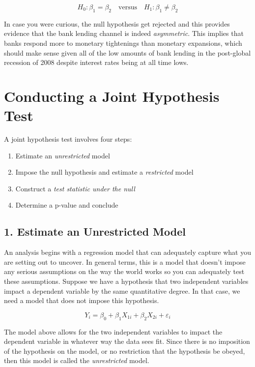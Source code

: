 \documentclass[
]{book}
\begin{document}
\[H_0: \beta_1=\beta_2 \quad \text{versus} \quad H_1: \beta_1 \neq \beta_2\]

In case you were curious, the null hypothesis get rejected and this provides evidence that the bank lending channel is indeed \emph{asymmetric}. This implies that banks respond more to monetary tightenings than monetary expansions, which should make sense given all of the low amounts of bank lending in the post-global recession of 2008 despite interest rates being at all time lows.

\hypertarget{conducting-a-joint-hypothesis-test}{%
\section{Conducting a Joint Hypothesis Test}\label{conducting-a-joint-hypothesis-test}}

A joint hypothesis test involves four steps:

\begin{enumerate}
\def\labelenumi{\arabic{enumi}.}
\item
  Estimate an \emph{unrestricted} model
\item
  Impose the null hypothesis and estimate a \emph{restricted} model
\item
  Construct a \emph{test statistic under the null}
\item
  Determine a p-value and conclude
\end{enumerate}

\hypertarget{estimate-an-unrestricted-model}{%
\subsection*{1. Estimate an Unrestricted Model}\label{estimate-an-unrestricted-model}}

An analysis begins with a regression model that can adequately capture what you are setting out to uncover. In general terms, this is a model that doesn't impose any serious assumptions on the way the world works so you can adequately test these assumptions. Suppose we have a hypothesis that two independent variables impact a dependent variable by the same quantitative degree. In that case, we need a model that does not impose this hypothesis.

\[Y_i = \beta_0 + \beta_1 X_{1i} + \beta_2 X_{2i} + \varepsilon_i\]

The model above allows for the two independent variables to impact the dependent variable in whatever way the data sees fit. Since there is no imposition of the hypothesis on the model, or no restriction that the hypothesis be obeyed, then this model is called the \emph{unrestricted} model.
\end{document}
